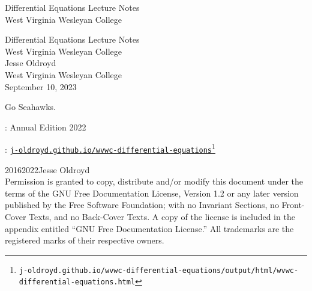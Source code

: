 \documentclass[twoside,10pt,]{book}
\newcommand{\titlepagefont}{\relax}
\newcommand{\mono}[1]{\texttt{#1}}
\numberwithin{equation}{part}
\begin{document}
\raggedbottom
\frontmatter
\thispagestyle{empty}
{\titlepagefont\centering
\vspace*{0.28\textheight}
{\Huge Differential Equations Lecture Notes}\\[2\baselineskip]
{\LARGE West Virginia Wesleyan College}\\
}
\clearpage
\thispagestyle{empty}
\null%
\clearpage
\thispagestyle{empty}
{\titlepagefont\centering
\vspace*{0.14\textheight}
{\Huge Differential Equations Lecture Notes}\\[\baselineskip]
{\LARGE West Virginia Wesleyan College}\\[3\baselineskip]
{\Large Jesse Oldroyd}\\[0.5\baselineskip]
{\Large West Virginia Wesleyan College}\\[3\baselineskip]
{\Large September 10, 2023}\\}
\clearpage
\thispagestyle{empty}
\hypertarget{colophon-front-colophon}{}\noindent
Go Seahawks.%
\par
{}
: Annual Edition 2022\par\medskip
{}: \href{https://j-oldroyd.github.io/wvwc-differential-equations/output/html/wvwc-differential-equations.html}{\mono{j-oldroyd.github.io/wvwc-differential-equations}}\footnote{\nolinkurl{j-oldroyd.github.io/wvwc-differential-equations/output/html/wvwc-differential-equations.html}\label{fn-front-colophon-b-b}}\par\medskip
\noindent\textcopyright{}2016\textendash{}2022\quad{}Jesse Oldroyd\\[0.5\baselineskip]
Permission is granted to copy, distribute and\slash{}or modify this document under the terms of the GNU Free Documentation License, Version 1.2 or any later version published by the Free Software Foundation; with no Invariant Sections, no Front-Cover Texts, and no Back-Cover Texts.  A copy of the license is included in the appendix entitled ``GNU Free Documentation License.''  All trademarks\texttrademark{} are the registered\textregistered{} marks of their respective owners.\par\medskip
\end{document}
